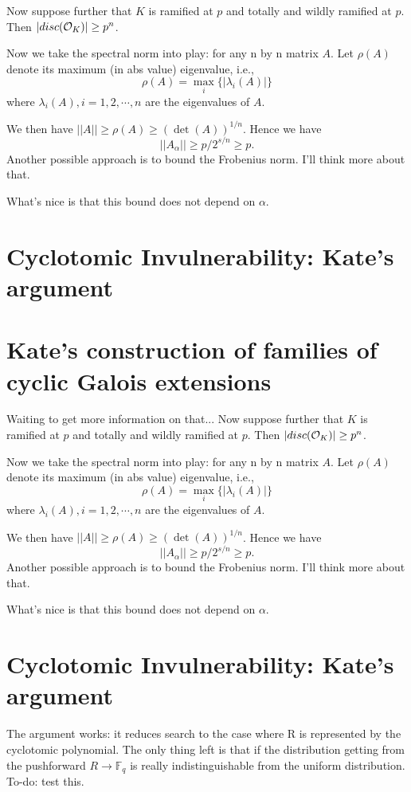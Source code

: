 \documentclass{amsart}
\begin{document}
Now suppose further that $K$ is ramified at $p$ and totally and wildly ramified at $p$. Then $|disc(\mathcal{O}_K)| \geq p^n$.

Now we take the spectral norm into play: for any n by n matrix $A$. Let $\rho(A)$
denote its maximum (in abs value) eigenvalue, i.e.,
\[
    \rho(A) = \max_{i} \{|\lambda_i(A)|\}
\]
where $\lambda_i(A), i = 1,2,\cdots, n$ are the eigenvalues of $A$.

We then have $||A|| \geq \rho(A) \geq (\det(A))^{1/n}$. Hence we have
\[
    ||A_\alpha|| \geq p/2^{s/n} \geq p.
\]
Another possible approach is to bound the Frobenius norm. I'll think more about that.

What's nice is that this bound does not depend on $\alpha$.

\section{Cyclotomic Invulnerability: Kate's argument}

\section{Kate's construction of families of cyclic Galois extensions}
Waiting to get more information on that...
Now suppose further that $K$ is ramified at $p$ and totally and wildly ramified at $p$. Then $|disc(\mathcal{O}_K)| \geq p^n$.

Now we take the spectral norm into play: for any n by n matrix $A$. Let $\rho(A)$
denote its maximum (in abs value) eigenvalue, i.e.,
\[
    \rho(A) = \max_{i} \{|\lambda_i(A)|\}
\]
where $\lambda_i(A), i = 1,2,\cdots, n$ are the eigenvalues of $A$.

We then have $||A|| \geq \rho(A) \geq (\det(A))^{1/n}$. Hence we have
\[
    ||A_\alpha|| \geq p/2^{s/n} \geq p.
\]
Another possible approach is to bound the Frobenius norm. I'll think more about that.

What's nice is that this bound does not depend on $\alpha$.

\section{Cyclotomic Invulnerability: Kate's argument}

The argument works: it reduces search to the case where R is represented by
the cyclotomic polynomial. The only thing left is that if the distribution
getting from the pushforward $R \to \mathbb{F}_q$ is really indistinguishable
from the uniform distribution. To-do: test this.
\end{document}
